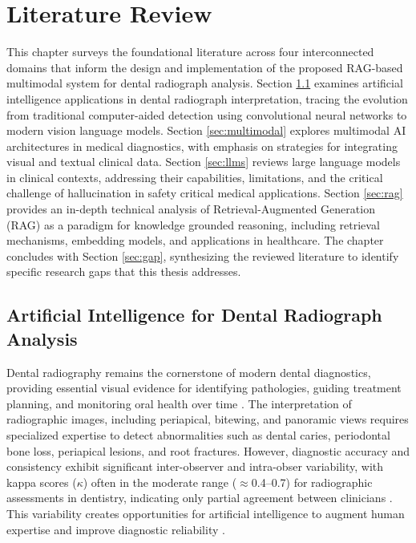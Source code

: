 \documentclass[12pt,a4paper]{report}
\begin{document}
	
	
	\chapter{Literature Review}
	\label{chap:literature}
	
	This chapter surveys the foundational literature across four interconnected domains that inform the design and implementation of the proposed RAG-based multimodal system for dental radiograph analysis. Section \ref{sec:ai_dental} examines artificial intelligence applications in dental radiograph interpretation, tracing the evolution from traditional computer-aided detection using convolutional neural networks to modern vision language models. Section \ref{sec:multimodal} explores multimodal AI architectures in medical diagnostics, with emphasis on strategies for integrating visual and textual clinical data. Section \ref{sec:llms} reviews large language models in clinical contexts, addressing their capabilities, limitations, and the critical challenge of hallucination in safety critical medical applications. Section \ref{sec:rag} provides an in-depth technical analysis of Retrieval-Augmented Generation (RAG) as a paradigm for knowledge grounded reasoning, including retrieval mechanisms, embedding models, and applications in healthcare. The chapter concludes with Section \ref{sec:gap}, synthesizing the reviewed literature to identify specific research gaps that this thesis addresses.
	
	\section{Artificial Intelligence for Dental Radiograph Analysis}
	\label{sec:ai_dental}
	
	Dental radiography remains the cornerstone of modern dental diagnostics, providing essential visual evidence for identifying pathologies, guiding treatment planning, and monitoring oral health over time \cite{white_pharoah_radiology}. The interpretation of radiographic images, including periapical, bitewing, and panoramic views requires specialized expertise to detect abnormalities such as dental caries, periodontal bone loss, periapical lesions, and root fractures. However, diagnostic accuracy and consistency exhibit significant inter-observer and intra-obser variability, with kappa scores ($\kappa$) often in the moderate range ($\approx$0.4–0.7) for radiographic assessments in dentistry, indicating only partial agreement between clinicians \cite{hintze1998reliability_caries,pillai2022interobserver_demirjian,saunders2001radiographic_reliability}. This variability creates opportunities for artificial intelligence to augment human expertise and improve diagnostic reliability \cite{putra2021ai_dental_radiography}.
	
\end{document}
